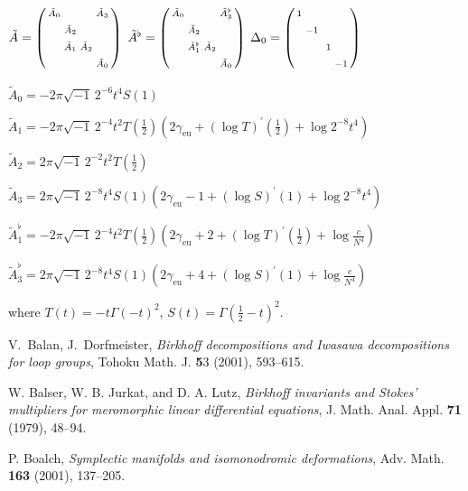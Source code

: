 \documentclass[a4paper,12pt,leqno]{amsart}
\numberwithin{equation}{section}
\theoremstyle{plain}
\theoremstyle{definition}
\newcommand{\De}{\Delta}
\newcommand{\Ga}{\Gamma}
\newcommand{\no}{\noindent}
\newcommand{\pr}{\prime}
\newcommand{\bsp}{\left(\begin{smallmatrix}}
\newcommand{\esp}{\end{smallmatrix}\right)}
\newcommand{\ii}{ {\scriptstyle\sqrt{-1}}\, }
\newcommand{\euler}{\gamma_{\scriptscriptstyle\text{eu}}}
\begin{document}
{$
\tilde A=
\bsp
\vphantom\sph
\tilde A_0 & & & \tilde A_3
\\
\vphantom\sph
 & \tilde A_2 & & 
\\
\vphantom\sph
 &   \tilde A_1 & \tilde A_2   & 
 \\
 \vphantom\sph
 & & & \tilde A_0
\esp
$
\quad
$
\tilde A^\flat=
\bsp
\vphantom\sph
\tilde A_0 & & & \tilde A^\flat_3
\\
\vphantom\sph
 & \tilde A_2 & & 
\\
\vphantom\sph
 &   \tilde A^\flat_1 & \tilde A_2   & 
 \\
 \vphantom\sph
 & & & \tilde A_0
\esp
$
\quad
$\De_0=
\bsp 
\vphantom\sph
1 & & & \\
\vphantom\sph
  & -1 & & \\
  \vphantom\sph
   & & \ 1 & \\
   \vphantom\sph
    & & & -1\esp
$

$\tilde A_0 = -2\pi\ii 2^{-6} t^4 S(1)$

$\tilde A_1 = -2\pi\ii 2^{-4} t^2
T(\tfrac12)\left(
2\euler  + (\log T)^\pr(\tfrac12) +   \log 2^{-8}t^4  
\right)$

$\tilde A_2 = 2\pi\ii 2^{-2}t^2T(\tfrac12)$

$\tilde A_3 = 2\pi\ii 2^{-8} t^4
S(1)\left(
2\euler-1  + (\log S)^\pr(1) +   \log 2^{-8}t^4  
\right)$

\smallskip

$\tilde A^\flat_1 = -2\pi\ii 2^{-4} t^2
T(\tfrac12)\left(
2\euler  + 2 + (\log T)^\pr(\tfrac12) +   \log \tfrac{c}{N^4} 
\right)$

$\tilde A^\flat_3 = 2\pi\ii 2^{-8} t^4
S(1)\left(
2\euler + 4 + (\log S)^\pr(1) +   \log \tfrac{c}{N^4}  
\right)$

\no where $T(t)=-t\Ga(-t)^2$, $S(t)=\Ga(\tfrac12-t)^2$.



\begin{thebibliography}{99}

V.~Balan, J.~Dorfmeister,
\emph{Birkhoff decompositions and Iwasawa decompositions for loop groups},
Tohoku Math. J.
{\textbf 53}
(2001),
593--615.
 
W. Balser, W. B. Jurkat, and D. A. Lutz,
\emph{Birkhoff invariants and Stokes' multipliers for meromorphic linear differential equations},
J. Math. Anal. Appl.
\textbf{71} 
(1979), 
48--94.

P. Boalch, 
\emph{Symplectic manifolds and isomonodromic deformations}, 
Adv. Math. 
\textbf{163} 
(2001), 
137--205.


\end{thebibliography}}
\end{document}
